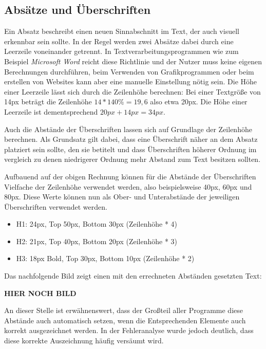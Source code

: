 \subsection{Absätze und Überschriften}
Ein Absatz beschreibt einen neuen Sinnabschnitt im Text, der auch visuell erkennbar sein sollte. In der Regel werden zwei Absätze dabei durch eine Leerzeile voneinander getrennt. In Textverarbeitungsprogrammen wie zum Beispiel \textit{Microsoft Word} reicht diese Richtlinie und der Nutzer muss keine eigenen Berechnungen durchführen, beim Verwenden von Grafikprogrammen oder beim erstellen von Websites kann aber eine manuelle Einstellung nötig sein. Die Höhe einer Leerzeile lässt sich durch die Zeilenhöhe berechnen: Bei einer Textgröße von 14px beträgt die Zeilenhöhe \(14 * 140\% = 19,6\) also etwa 20px. Die Höhe einer Leerzeile ist dementsprechend \(20px + 14px = 34px\).

Auch die Abstände der Überschriften lassen sich auf Grundlage der Zeilenhöhe berechnen. Als Grundsatz gilt dabei, dass eine Überschrift näher an dem Absatz platziert sein sollte, den sie betitelt und dass Überschriften höherer Ordnung im vergleich zu denen niedrigerer Ordnung mehr Abstand zum Text besitzen sollten.

Aufbauend auf der obigen Rechnung können für die Abstände der Überschriften Vielfache der Zeilenhöhe verwendet werden, also beispielsweise 40px, 60px und 80px. Diese Werte können nun als Ober- und Unterabstände der jeweiligen Überschriften verwendet werden.

\begin{itemize}
	\item H1: 24px, Top 50px, Bottom 30px (Zeilenhöhe * 4)
	\item H2: 21px, Top 40px, Bottom 20px (Zeilenhöhe * 3)
	\item H3: 18px Bold, Top 30px, Bottom 10px (Zeilenhöhe * 2)
\end{itemize}

Das nachfolgende Bild zeigt einen mit den errechneten Abständen gesetzten Text:

\textbf{HIER NOCH BILD}

An dieser Stelle ist erwähnenswert, dass der Großteil aller Programme diese Abstände auch automatisch setzen, wenn die Entsprechenden Elemente auch korrekt ausgezeichnet werden. In der Fehleranalyse wurde jedoch deutlich, dass diese korrekte Auszeichnung häufig versäumt wird.



